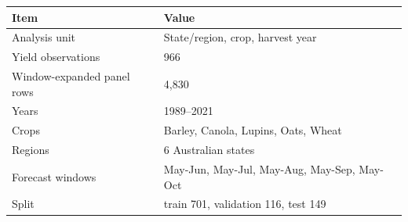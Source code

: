 \begin{tabular}{ll}
\toprule
Item & Value \\
\midrule
Analysis unit & State/region, crop, harvest year \\
Yield observations & 966 \\
Window-expanded panel rows & 4,830 \\
Years & 1989--2021 \\
Crops & Barley, Canola, Lupins, Oats, Wheat \\
Regions & 6 Australian states \\
Forecast windows & May-Jun, May-Jul, May-Aug, May-Sep, May-Oct \\
Split & train 701, validation 116, test 149 \\
\bottomrule
\end{tabular}

